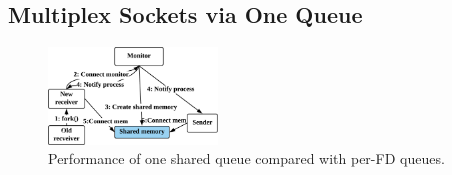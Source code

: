 



\subsection{Multiplex Sockets via One Queue}
\label{subsec:multiplex-conn}


\begin{figure}[t]
	\centering
	\includegraphics[width=0.4\textwidth]{images/fork}
	\vspace{-5pt}
	\caption{Performance of one shared queue compared with per-FD queues.}
	\label{fig:multiplex-queue}
	\vspace{-15pt}
\end{figure}


